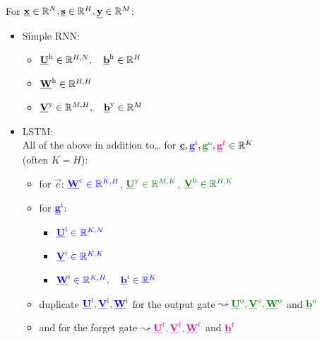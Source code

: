 \begin{frame}\frametitle{\subsecname}
		For $\vec x \in \R^N, \vec s \in \R^H, \vec y \in \R^M$:\\
		\begin{itemize}
		\item[]
			Simple RNN:\\
			\begin{itemize}
			\item $\vec U^{\mathrm{h}} \in \R^{H,N},\quad \vec b^{\mathrm{h}} \in \R^{H}$
			\item $\vec W^{\mathrm{h}} \in \R^{H,H}$
			\item $\vec V^{\mathrm{y}} \in \R^{M,H},\quad \vec b^{\mathrm{y}} \in \R^{M}$
			\end{itemize}
			\pause
			
		\item[]
			LSTM:\\
			All of the above in addition to\ldots
			for $\vec c, {\color{blue}\vec g^{\mathrm{i}}}, {\color{darkgreen}\vec g^{\mathrm{o}}}, {\color{magenta}\vec g^{\mathrm{f}}} \in \R^K$\\
			(often $K=H$):\\
			\pause
			\begin{itemize}
			\item for $\vec c$:
             $\color{blue}\vec W^{\mathrm{c}} \in \R^{K,H}$, 
			 $\color{darkgreen}\vec U^{\mathrm{y}} \in \R^{M,K}$,
			 $\color{darkgreen}\vec V^{\mathrm{h}} \in \R^{H,K}$
			\item[] for ${\color{blue}\vec g^{\mathrm{i}}}$:
            \begin{itemize}
                \item $\color{blue}\vec U^{\mathrm{i}} \in \R^{K,N}$
                \item $\color{blue}\vec V^{\mathrm{i}} \in \R^{K,K}$
                \item $\color{blue}\vec W^{\mathrm{i}} \in \R^{K,H}, \quad \vec b^{\mathrm{i}} \in \R^{K}$
			\end{itemize}
            \item duplicate $\color{blue}\vec U^{\mathrm{i}}, \color{blue}\vec V^{\mathrm{i}}, \color{blue}\vec W^{\mathrm{i}}$
			for the output gate $\leadsto \color{darkgreen}\vec U^{\mathrm{o}}, \color{darkgreen}\vec V^{\mathrm{o}}, \color{darkgreen}\vec W^{\mathrm{o}}$ and $\color{darkgreen}\vec b^{\mathrm{o}}$
			\item and for the forget gate $\leadsto \color{magenta}\vec U^{\mathrm{f}}, \color{magenta}\vec V^{\mathrm{f}}, \color{magenta}\vec W^{\mathrm{f}}$ and $\color{magenta}\vec b^{\mathrm{f}}$
			\end{itemize}
		\end{itemize}
		
       
\end{frame}


